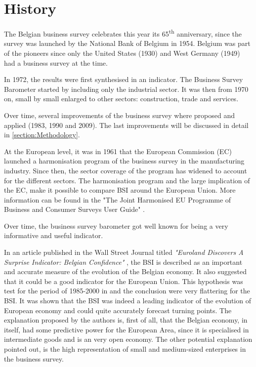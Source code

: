 \documentclass[12pt,a4paper,oneside]{book}
\begin{document}
\section{History}

The Belgian business survey celebrates this year its 65\textsuperscript{th} anniversary, since the survey was launched by the National Bank of Belgium in 1954. 
Belgium was part of the pioneers since only the United States (1930) and West Germany (1949) had a business survey at the time. 

In 1972, the results were first synthesised in an indicator.
The Business Survey Barometer started by including only the industrial sector. It was then from 1970 on, small by small enlarged to other sectors: construction, trade and services. 

Over time, several improvements of the business survey where proposed and applied (1983, 1990 and 2009). The last improvements will be discussed in detail in \autoref{section:Methodology}.

At the European level, it was in 1961 that the European Commission (EC) launched a harmonisation program of the business survey in the manufacturing industry. 
Since then, the sector coverage of the program has widened to account for the different sectors.
The harmonisation program and the large implication of the EC, make it possible to compare BSI around the European Union.
More information can be found in the "The Joint Harmonised EU Programme of Business and Consumer Surveys User Guide" \cite{european_commission_joint_2016}.

Over time, the business survey barometer got well known for being a very informative and useful indicator. 

In an article published in the Wall Street Journal titled \textit{"Euroland Discovers A Surprise Indicator: Belgian Confidence"} \citep{rhoads_euroland_1999}, the BSI is described as an important and accurate measure of the evolution of the Belgian economy. 
It also suggested that it could be a good indicator for the European Union. 
This hypothesis was test for the period of 1985-2000 in \cite{vanhaelen_belgian_2000} and the conclusion were very flattering for the BSI. 
It was shown that the BSI was indeed a leading indicator of the evolution of European economy and could quite accurately forecast turning points. 
The explanation proposed by the authors is, first of all, that the Belgian economy, in itself, had some predictive power for the European Area, since it is specialised  in  intermediate  goods and is an very open economy. 
The other potential explanation pointed out, is the high  representation  of  small and medium-sized enterprises in the business survey.
\end{document}

